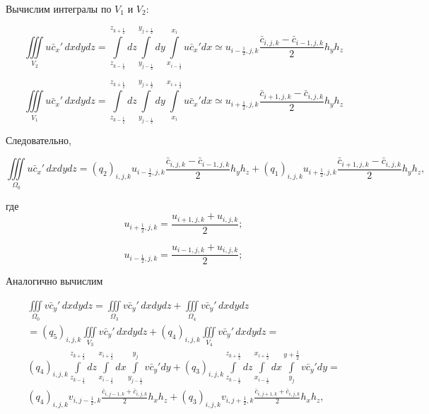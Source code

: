 \documentclass[12pt]{article}
\begin{document}
Вычислим интегралы по $V_1$ и $V_2$:

\begin{equation*}
	\iiint\limits_{V_2} u\bar{c}_x'\,dxdydz = \int\limits_{z_{k-\frac{1}{2}}}^{z_{k+\frac{1}{2}}}dz \int\limits_{y_{j-\frac{1}{2}}}^{y_{j+\frac{1}{2}}}dy   \int\limits_{x_{i-\frac{1}{2}}}^{x_{i}}u\bar{c}_x'dx \simeq u_{{i-\frac{1}{2}},j,k}\frac{\bar{c}_{i,j,k}-\bar{c}_{i-1,j,k}}{2}h_yh_z
\end{equation*}

\begin{equation*}
\iiint\limits_{V_1} u\bar{c}_x'\,dxdydz = \int\limits_{z_{k-\frac{1}{2}}}^{z_{k+\frac{1}{2}}}dz \int\limits_{y_{j-\frac{1}{2}}}^{y_{j+\frac{1}{2}}}dy   \int\limits_{x_i}^{x_{i+\frac{1}{2}}}u\bar{c}_x'dx \simeq u_{{i+\frac{1}{2}},j,k}\frac{\bar{c}_{i+1,j,k}-\bar{c}_{i,j,k}}{2}h_yh_z
\end{equation*}

Следовательно,

\begin{equation}
	\iiint\limits_{\Omega_0} u\bar{c}_x'\,dxdydz = (q_2)_{i,j,k}u_{{i-\frac{1}{2}},j,k}\frac{\bar{c}_{i,j,k}-\bar{c}_{i-1,j,k}}{2}h_yh_z +
	(q_1)_{i,j,k}u_{{i+\frac{1}{2}},j,k}\frac{\bar{c}_{i+1,j,k}-\bar{c}_{i,j,k}}{2}h_yh_z,
\end{equation}

где 
\begin{equation*} 
	u_{{i+\frac{1}{2}},j,k} = \frac{u_{i+1,j,k}+u_{i,j,k}}{2};
\end{equation*}

\begin{equation*} 
	u_{{i-\frac{1}{2}},j,k} = \frac{u_{i-1,j,k}+u_{i,j,k}}{2};
\end{equation*}


Аналогично вычислим

\begin{multline*}
	\iiint\limits_{\Omega_0} v\bar{c}_y'\,dxdydz = 
	\iiint\limits_{\Omega_3} v\bar{c}_y'\,dxdydz + 
	\iiint\limits_{\Omega_4} v\bar{c}_y'\,dxdydz \\  
	= (q_5)_{i,j,k}\iiint\limits_{V_3} v\bar{c}_y'\,dxdydz +
	 (q_4)_{i,j,k}\iiint\limits_{V_4} v\bar{c}_y'\,dxdydz = \\
	 (q_4)_{i,j,k}\int\limits_{z_{k-\frac{1}{2}}}^{z_{k+\frac{1}{2}}}dz\int\limits_{x_{i-\frac{1}{2}}}^{x_{i+\frac{1}{2}}}dx\int\limits_{y_{j-\frac{1}{2}}}^{y_j}v\bar{c}_y'dy + (q_3)_{i,j,k}\int\limits_{z_{k-\frac{1}{2}}}^{z_{k+\frac{1}{2}}}dz\int\limits_{x_{i-\frac{1}{2}}}^{x_{i+\frac{1}{2}}}dx\int\limits_{y_j}^{y+\frac{1}{2}}v\bar{c}_y'dy = \\
	 (q_4)_{i,j,k}v_{i,j-\frac{1}{2},k}\frac{\bar{c}_{i,j-1,k}+\bar{c}_{i,j,k}}{2}h_xh_z + (q_3)_{i,j,k}v_{i,j+\frac{1}{2},k}\frac{\bar{c}_{i,j+1,k}+\bar{c}_{i,j,k}}{2}h_xh_z,
\end{multline*}
\end{document}
